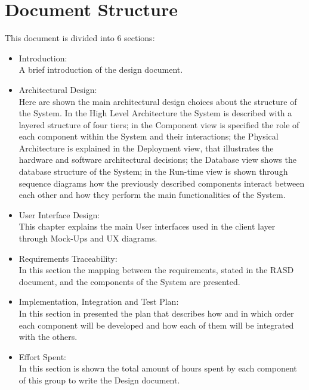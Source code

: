 \section{Document Structure}
This document is divided into 6 sections:
\begin{itemize}
\item Introduction:\\
A brief introduction of the design document.

\item Architectural Design:\\
Here are shown the main architectural design choices about the structure of the System. In the High Level Architecture the System is described with a layered structure of four tiers; in the Component view is specified the role of each component within the System and their interactions; the Physical Architecture is explained in the Deployment view, that illustrates the hardware and software architectural decisions; the Database view shows the database structure of the System; in the Run-time view is shown through sequence diagrams how the previously described components interact between each other and how they perform the main functionalities of the System.

\item User Interface Design:\\
This chapter explains the main User interfaces used in the client layer through Mock-Ups and UX diagrams.

\item Requirements Traceability:\\
In this section the mapping between the requirements, stated in the RASD document, and the components of the System are presented.

\item Implementation, Integration and Test Plan:\\
In this section in presented the plan that describes how and in which order each component will be developed and how each of them will be integrated with the others.

\item Effort Spent:\\
In this section is shown the total amount of hours spent by each component of this group to write the Design document.

\end{itemize}